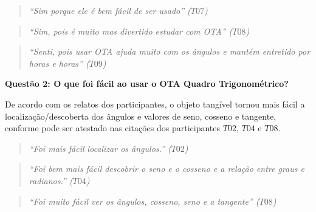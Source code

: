 \begin{quote}
	\textit{``Sim porque ele é bem fácil de ser usado'' ($T07$)}
\end{quote}

\begin{quote}
	\textit{``Sim, pois é muito mas divertido estudar com OTA'' ($T08$)}
\end{quote}

\begin{quote}
	\textit{``Senti, pois usar OTA ajuda muito com os ângulos e mantém entretido por horas e horas'' ($T09$)}
\end{quote}



\textbf{Questão 2: O que foi fácil ao usar o OTA Quadro Trigonométrico?}

De acordo com os relatos dos participantes, o objeto tangível tornou mais fácil a localização/descoberta dos ângulos e valores de seno, cosseno e tangente, conforme pode ser atestado nas citações dos participantes $T02$, $T04$ e $T08$.

\begin{quote}
	\textit{``Foi mais fácil localizar os ângulos.'' ($T02$)}
\end{quote}

\begin{quote}
	\textit{``Foi bem mais fácil descobrir o seno e o cosseno e a relação entre graus e radianos.'' ($T04$)}
\end{quote}

\begin{quote}
	\textit{``Foi muito fácil ver os ângulos, cosseno, seno e a tangente'' ($T08$)}
\end{quote}



